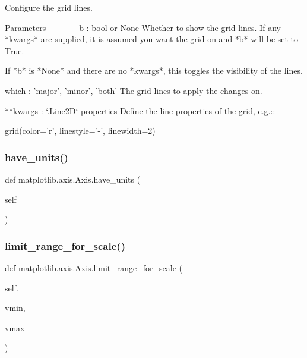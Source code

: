 \begin{DoxyVerb}Configure the grid lines.

Parameters
----------
b : bool or None
    Whether to show the grid lines. If any *kwargs* are supplied,
    it is assumed you want the grid on and *b* will be set to True.

    If *b* is *None* and there are no *kwargs*, this toggles the
    visibility of the lines.

which : {'major', 'minor', 'both'}
    The grid lines to apply the changes on.

**kwargs : `.Line2D` properties
    Define the line properties of the grid, e.g.::

grid(color='r', linestyle='-', linewidth=2)
\end{DoxyVerb}
 \mbox{\label{classmatplotlib_1_1axis_1_1Axis_aea3d6db5d212968216ecc63c9615e5a3}} 
\subsubsection{\texorpdfstring{have\+\_\+units()}{have\_units()}}
{\footnotesize\ttfamily def matplotlib.\+axis.\+Axis.\+have\+\_\+units (\begin{DoxyParamCaption}\item[{}]{self }\end{DoxyParamCaption})}

\mbox{\label{classmatplotlib_1_1axis_1_1Axis_a4893adfea4b5ec77f2be7db0862fb0d6}} 
\subsubsection{\texorpdfstring{limit\+\_\+range\+\_\+for\+\_\+scale()}{limit\_range\_for\_scale()}}
{\footnotesize\ttfamily def matplotlib.\+axis.\+Axis.\+limit\+\_\+range\+\_\+for\+\_\+scale (\begin{DoxyParamCaption}\item[{}]{self,  }\item[{}]{vmin,  }\item[{}]{vmax }\end{DoxyParamCaption})}

